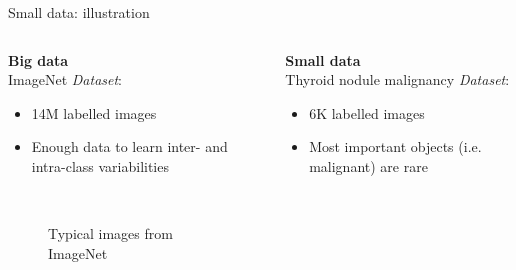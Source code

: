 \documentclass{beamer}
\begin{document}
\begin{frame}{Small data: illustration}
\begin{columns}
\begin{column}{0.48\textwidth}
	\footnotesize
	\center
		{\small	
		\textbf{Big data} \\
		ImageNet\footnotemark
		}
	\vfill
	\flushleft
		\textit{Dataset}: 
		\begin{itemize}
			\item 14M labelled images
			\item Enough data to learn inter- and intra-class variabilities
		\end{itemize}
		
		\begin{figure}[!h]
			\\
			\caption{Typical images from ImageNet}
		\end{figure}
\end{column}
\hfill
\begin{column}{0.5\textwidth}  
	\footnotesize
	\center
		{\small		
		\textbf{Small data} \\
		Thyroid nodule malignancy
		}
	\vfill
	\flushleft
		\textit{Dataset}:
		\begin{itemize}
			\item 6K labelled images
			\item Most important objects (i.e. malignant) are rare
		\end{itemize}
	

\end{column}
\end{columns}
\end{frame}
\end{document}
